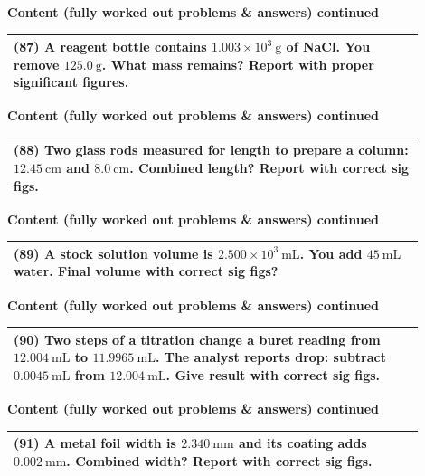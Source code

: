 \documentclass{article}
\begin{document}
\noindent
{\large \textbf{Content (fully worked out problems \& answers) continued}} \\[0.2em]
\begin{tabular}{|p{0.9\linewidth}|}
\hline
\vspace{0.2cm}
\textbf{(87)} A reagent bottle contains $1.003\times10^{3}~\text{g}$ of NaCl. You remove $125.0~\text{g}$. What mass remains? Report with proper significant figures. \\
\hline
\end{tabular}
\newpage

\noindent
{\large \textbf{Content (fully worked out problems \& answers) continued}} \\[0.2em]
\begin{tabular}{|p{0.9\linewidth}|}
\hline
\vspace{0.2cm}
\textbf{(88)} Two glass rods measured for length to prepare a column: $12.45~\text{cm}$ and $8.0~\text{cm}$. Combined length? Report with correct sig figs. \\
\hline
\end{tabular}
\newpage

\noindent
{\large \textbf{Content (fully worked out problems \& answers) continued}} \\[0.2em]
\begin{tabular}{|p{0.9\linewidth}|}
\hline
\vspace{0.2cm}
\textbf{(89)} A stock solution volume is $2.500\times10^{3}~\text{mL}$. You add $45~\text{mL}$ water. Final volume with correct sig figs? \\
\hline
\end{tabular}
\newpage

\noindent
{\large \textbf{Content (fully worked out problems \& answers) continued}} \\[0.2em]
\begin{tabular}{|p{0.9\linewidth}|}
\hline
\vspace{0.2cm}
\textbf{(90)} Two steps of a titration change a buret reading from $12.004~\text{mL}$ to $11.9965~\text{mL}$. The analyst reports drop: subtract $0.0045~\text{mL}$ from $12.004~\text{mL}$. Give result with correct sig figs. \\
\hline
\end{tabular}
\newpage

\noindent
{\large \textbf{Content (fully worked out problems \& answers) continued}} \\[0.2em]
\begin{tabular}{|p{0.9\linewidth}|}
\hline
\vspace{0.2cm}
\textbf{(91)} A metal foil width is $2.340~\text{mm}$ and its coating adds $0.002~\text{mm}$. Combined width? Report with correct sig figs. \\
\hline
\end{tabular}
\newpage
\end{document}

